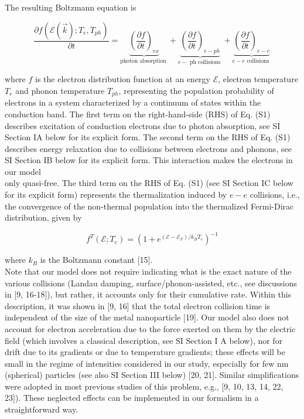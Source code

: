\documentclass[10pt]{article}
\begin{document}
The resulting Boltzmann equation is


\begin{equation*}
\frac{\partial f\left(\mathcal{E}(\vec{k}) ; T_{e}, T_{p h}\right)}{\partial t}=\underbrace{\left(\frac{\partial f}{\partial t}\right)_{e x}}_{\text {photon absorption }}+\underbrace{\left(\frac{\partial f}{\partial t}\right)_{e-p h}}_{e-\text { ph collisions }}+\underbrace{\left(\frac{\partial f}{\partial t}\right)_{e-e}}_{e-e \text { collisions }} \tag{S1}
\end{equation*}


where $f$ is the electron distribution function at an energy $\mathcal{E}$, electron temperature $T_{e}$ and phonon temperature $T_{p h}$, representing the population probability of electrons in a system characterized by a continuum of states within the conduction band. The first term on the right-hand-side (RHS) of Eq. (S1) describes excitation of conduction electrons due to photon absorption, see SI Section IA below for its explicit form. The second term on the RHS of Eq. (S1) describes energy relaxation due to collisions between electrons and phonons, see SI Section IB below for its explicit form. This interaction makes the electrons in our model\\
only quasi-free. The third term on the RHS of Eq. (S1) (see SI Section IC below for its explicit form) represents the thermalization induced by $e-e$ collisions, i.e., the convergence of the non-thermal population into the thermalized Fermi-Dirac distribution, given by


\begin{equation*}
f^{T}\left(\mathcal{E} ; T_{e}\right)=\left(1+e^{\left(\mathcal{E}-\mathcal{E}_{F}\right) / k_{B} T_{e}}\right)^{-1} \tag{S2}
\end{equation*}


where $k_{B}$ is the Boltzmann constant [15].\\[0pt]
Note that our model does not require indicating what is the exact nature of the various collisions (Landau damping, surface/phonon-assisted, etc., see discussions in [9, 16-18]), but rather, it accounts only for their cumulative rate. Within this description, it was shown in [9, 16] that the total electron collision time is independent of the size of the metal nanoparticle [19]. Our model also does not account for electron acceleration due to the force exerted on them by the electric field (which involves a classical description, see SI Section I A below), nor for drift due to its gradients or due to temperature gradients; these effects will be small in the regime of intensities considered in our study, especially for few nm (spherical) particles (see also SI Section III below) [20, 21]. Similar simplifications were adopted in most previous studies of this problem, e.g., [9, 10, 13, 14, 22, 23]). These neglected effects can be implemented in our formalism in a straightforward way.
\end{document}

